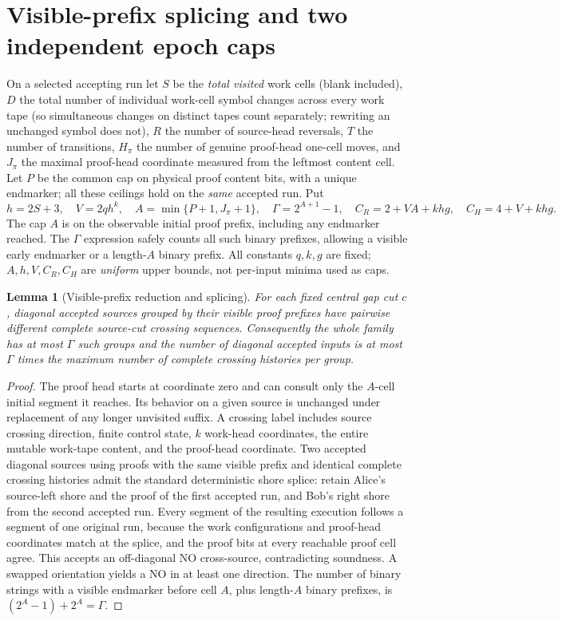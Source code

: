\documentclass[11pt]{article}
\newtheorem{lemma}[theorem]{Lemma}
\begin{document}
\section{Visible-prefix splicing and two independent epoch caps}
On a selected accepting run let $S$ be the \emph{total visited} work cells (blank included), $D$ the total number of individual work-cell symbol changes across every work tape (so simultaneous changes on distinct tapes count separately; rewriting an unchanged symbol does not), $R$ the number of source-head reversals, $T$ the number of transitions, $H_\pi$ the number of genuine proof-head one-cell moves, and $J_\pi$ the maximal proof-head coordinate measured from the leftmost content cell. Let $P$ be the common cap on physical proof content bits, with a unique endmarker; all these ceilings hold on the \emph{same} accepted run. Put
\[
h=2S+3,\quad V=2qh^k,\quad A=\min\{P+1,J_\pi+1\},\quad
\Gamma=2^{A+1}-1,
\quad C_R=2+VA+khg,\quad C_H=4+V+khg.
\tag{1}
\]
The cap $A$ is on the observable initial proof prefix, including any endmarker reached. The $\Gamma$ expression safely counts all such binary prefixes, allowing a visible early endmarker or a length-$A$ binary prefix. All constants $q,k,g$ are fixed; $A,h,V,C_R,C_H$ are \emph{uniform} upper bounds, not per-input minima used as caps.

\begin{lemma}[Visible-prefix reduction and splicing]\label{lem:prefix}
For each fixed central gap cut $c$, diagonal accepted sources grouped by their visible proof prefixes have pairwise different \emph{complete} source-cut crossing sequences. Consequently the whole family has at most $\Gamma$ such groups and the number of diagonal accepted inputs is at most $\Gamma$ times the maximum number of complete crossing histories per group.
\end{lemma}
\begin{proof}
The proof head starts at coordinate zero and can consult only the $A$-cell initial segment it reaches. Its behavior on a given source is unchanged under replacement of any longer unvisited suffix. A crossing label includes source crossing direction, finite control state, $k$ work-head coordinates, the entire mutable work-tape content, and the proof-head coordinate. Two accepted diagonal sources using proofs with the same visible prefix and identical complete crossing histories admit the standard deterministic shore splice: retain Alice's source-left shore and the proof of the first accepted run, and Bob's right shore from the second accepted run. Every segment of the resulting execution follows a segment of one original run, because the work configurations and proof-head coordinates match at the splice, and the proof bits at every reachable proof cell agree. This accepts an off-diagonal NO cross-source, contradicting soundness. A swapped orientation yields a NO in at least one direction. The number of binary strings with a visible endmarker before cell $A$, plus length-$A$ binary prefixes, is $(2^A-1)+2^A=\Gamma$.
\end{proof}
\end{document}
